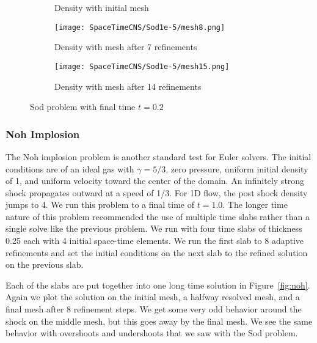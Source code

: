 \documentclass[Proposal.tex]{subfiles}
\begin{document}
\begin{figure}[p]
\begin{subfigure}[c]{0.45\textwidth}
\caption{Density with initial mesh}
\label{fig:sod_mesh0}
\end{subfigure}
\begin{subfigure}[c]{0.45\textwidth}
\centering
\texttt{[image: SpaceTimeCNS/Sod1e-5/mesh8.png]}
\caption{Density with mesh after 7 refinements}
\label{fig:sod_mesh7}
\end{subfigure}
\begin{subfigure}[c]{0.9\textwidth}
\centering
\texttt{[image: SpaceTimeCNS/Sod1e-5/mesh15.png]}
\caption{Density with mesh after 14 refinements}
\label{fig:sod_mesh14}
\end{subfigure}
\caption{Sod problem with final time $t=0.2$}
\label{fig:sod}
\end{figure}

\subsubsection{Noh Implosion}
The Noh implosion problem\cite{Noh1987} is another standard test for Euler solvers.
The initial conditions are of an ideal gas with $\gamma=5/3$, zero pressure, uniform initial density of 1, 
and uniform velocity toward the center of the domain.
An infinitely strong shock propagates outward at a speed of 1/3.
For 1D flow, the post shock density jumps to 4.
We run this problem to a final time of $t=1.0$.
The longer time nature of this problem recommended the use of multiple time slabs rather than a single solve like the previous problem.
We run with four time slabs of thickness 0.25 each with 4 initial space-time elements.
We run the first slab to 8 adaptive refinements and set the initial conditions on the next slab to the refined solution on the previous slab.

Each of the slabs are put together into one long time solution in Figure~\ref{fig:noh}. 
Again we plot the solution on the initial mesh, a halfway resolved mesh, and a final mesh after 8 refinement steps.
We get some very odd behavior around the shock on the middle mesh, but this goes away by the final mesh.
We see the same behavior with overshoots and undershoots that we saw with the Sod problem. 
\end{document}
